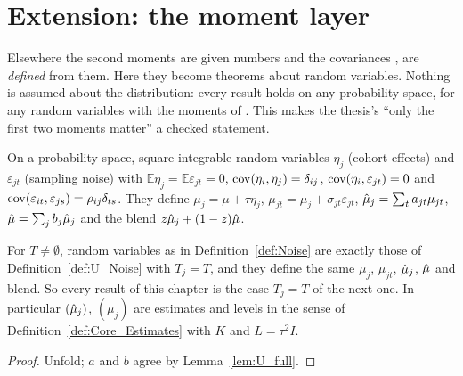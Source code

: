 \chapter{Extension: the moment layer}\label{ch:moments}

Elsewhere the second moments are given numbers and the covariances
,  are \emph{defined} from them. Here they become
theorems about random variables. Nothing is assumed about the distribution:
every result holds on any probability space, for any random variables with
the moments of . This makes the thesis's ``only the first two
moments matter'' a checked statement.

\begin{definition}\label{def:Noise}
  \leanok
  On a probability space, square-integrable random variables $\eta_j$
  (cohort effects) and $\varepsilon_{jt}$ (sampling noise) with
  $\mathbb E\eta_j = \mathbb E\varepsilon_{jt} = 0$,
  $\operatorname{cov}(\eta_i,\eta_j) = \delta_{ij}$, $\operatorname{cov}(\eta_i,\varepsilon_{jt}) = 0$ and
  $\operatorname{cov}(\varepsilon_{it},\varepsilon_{js}) = \rho_{ij}\delta_{ts}$. They define
  $\mu_j = \mu + \tau\eta_j$, $\mu_{jt} = \mu_j + \sigma_{jt}\varepsilon_{jt}$,
  $\hat\mu_j = \sum_t a_{jt}\mu_{jt}$, $\hat\mu = \sum_j b_j\hat\mu_j$ and the blend
  $z\hat\mu_j + (1-z)\hat\mu$.
\end{definition}

\begin{lemma}\label{lem:moments_full}
  \leanok
  For $T \neq \emptyset$, random variables as in Definition~\ref{def:Noise}
  are exactly those of Definition~\ref{def:U_Noise} with $T_j = T$, and they
  define the same $\mu_j$, $\mu_{jt}$, $\hat\mu_j$, $\hat\mu$ and blend. So every
  result of this chapter is the case $T_j = T$ of the next one. In
  particular $(\hat\mu_j)$, $(\mu_j)$ are estimates and levels in the sense of
  Definition~\ref{def:Core_Estimates} with $K$ and $L = \tau^2 I$.
\end{lemma}
\begin{proof}
  \leanok
  Unfold; $a$ and $b$ agree by Lemma~\ref{lem:U_full}.
\end{proof}

